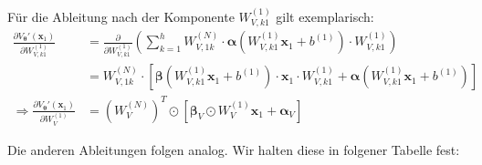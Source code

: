 \documentclass[a4paper, 12pt]{scrartcl}
\begin{document}
Für die Ableitung nach der Komponente $W_{V,k1}^{(1)}$ gilt exemplarisch:
\begin{align*}
    \frac{\partial V_{\bm{\theta}}'(\bm{x}_1)}{\partial W_{V,k1}^{(1)}}
    &=
    \frac{\partial}{\partial W_{V,k1}^{(1)}}
    \left(
        \sum_{k=1}^{h} 
        W_{V, 1k}^{(N)} 
        \cdot
        \bm{\alpha}\left(W_{V,k1}^{(1)} \bm{x}_1 + b^{(1)} \right)
        \cdot 
        W_{V,k1}^{(1)}
    \right)
    \\
    &=
    W_{V, 1k}^{(N)} 
    \cdot
    \left[
        \bm{\beta}\left(W_{V,k1}^{(1)} \bm{x}_1 + b^{(1)} \right)
        \cdot 
        \bm{x}_1 
        \cdot
        W_{V,k1}^{(1)}
        +
        \bm{\alpha}\left(W_{V,k1}^{(1)} \bm{x}_1 + b^{(1)} \right)
    \right]
    \\
    \Rightarrow
    \frac{\partial V_{\bm{\theta}}'(\bm{x}_1)}{\partial W_{V}^{(1)}}
    &=
    \left(W_V^{(N)}\right)^T 
    \odot
    \left[
        \bm{\beta}_V \odot W_V^{(1)} \bm{x}_1 
        +
        \bm{\alpha}_V
    \right]
\end{align*}

Die anderen Ableitungen folgen analog. 
Wir halten diese in folgener Tabelle fest:
\end{document}
